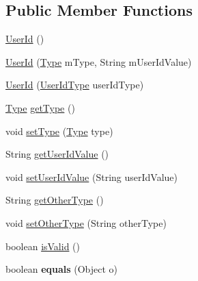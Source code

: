 \subsection*{Public Member Functions}
\begin{DoxyCompactItemize}
\item 
\hyperlink{classcom_1_1bluevia_1_1commons_1_1data_1_1UserId_a941c38ebd2a6e3131b69bfc0ab7eb470}{UserId} ()
\item 
\hyperlink{classcom_1_1bluevia_1_1commons_1_1data_1_1UserId_a1bb60926236af2cbd614be93e2e3556c}{UserId} (\hyperlink{classcom_1_1bluevia_1_1commons_1_1data_1_1UserId_a159e600181e6a14e769bb0a86f2c981a}{Type} mType, String mUserIdValue)
\item 
\hyperlink{classcom_1_1bluevia_1_1commons_1_1data_1_1UserId_a200115037c93a83939fe040c8356b6d5}{UserId} (\hyperlink{classcom_1_1telefonica_1_1schemas_1_1unica_1_1rest_1_1common_1_1v1_1_1UserIdType}{UserIdType} userIdType)
\item 
\hyperlink{classcom_1_1bluevia_1_1commons_1_1data_1_1UserId_a159e600181e6a14e769bb0a86f2c981a}{Type} \hyperlink{classcom_1_1bluevia_1_1commons_1_1data_1_1UserId_a73c4b64dde9ecec53b38600752e8e76a}{getType} ()
\item 
void \hyperlink{classcom_1_1bluevia_1_1commons_1_1data_1_1UserId_ac70064b93362d98e0c3fcef5d9a95fe3}{setType} (\hyperlink{classcom_1_1bluevia_1_1commons_1_1data_1_1UserId_a159e600181e6a14e769bb0a86f2c981a}{Type} type)
\item 
String \hyperlink{classcom_1_1bluevia_1_1commons_1_1data_1_1UserId_a3e06d48570c63a349aeec71d9254eb2b}{getUserIdValue} ()
\item 
void \hyperlink{classcom_1_1bluevia_1_1commons_1_1data_1_1UserId_a6680f85f1d57fd7ef1351f74c15d5359}{setUserIdValue} (String userIdValue)
\item 
String \hyperlink{classcom_1_1bluevia_1_1commons_1_1data_1_1UserId_af62000c371d9a7db040848064acecc5a}{getOtherType} ()
\item 
void \hyperlink{classcom_1_1bluevia_1_1commons_1_1data_1_1UserId_a4ec27e1344089289395c29131d0db2ad}{setOtherType} (String otherType)
\item 
boolean \hyperlink{classcom_1_1bluevia_1_1commons_1_1data_1_1UserId_a07a36a539a751ffadf0a820f66c5a2d0}{isValid} ()
\item 
\hypertarget{classcom_1_1bluevia_1_1commons_1_1data_1_1UserId_a626ae0ff173431dbdac3940f2ef676b1}{
boolean {\bfseries equals} (Object o)}
\label{classcom_1_1bluevia_1_1commons_1_1data_1_1UserId_a626ae0ff173431dbdac3940f2ef676b1}


\end{DoxyCompactItemize}
